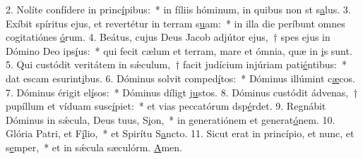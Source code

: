 2. Nolíte confídere in princ\uline{í}pibus:~* in fíliis hóminum, in quibus non st s\uline{a}lus.
3. Exíbit spíritus ejus, et revertétur in terram s\uline{u}am:~* in illa die períbunt omnes cogitatiónes \uline{ó}rum.
4. Beátus, cujus Deus Jacob adjútor ejus,~† spes ejus in Dómino Deo ips\uline{í}us:~* qui fecit cælum et terram, mare et ómnia, quæ in \uline{i}s sunt.
5. Qui custódit veritátem in sǽculum,~† facit judícium injúriam pati\uline{é}ntibus:~* dat escam esurint\uline{i}bus.
6. Dóminus solvit comped\uline{í}tos:~* Dóminus illúmint c\uline{æ}cos.
7. Dóminus érigit el\uline{í}sos:~* Dóminus díligt j\uline{u}stos.
8. Dóminus custódit ádvenas,~† pupíllum et víduam susc\uline{í}piet:~* et vias peccatórum dsp\uline{é}rdet.
9. Regnábit Dóminus in sǽcula, Deus tuus, S\uline{i}on,~* in generatiónem et generat\uline{ó}nem.
10. Glória Patri, et F\uline{í}lio,~* et Spirítu S\uline{a}ncto.
11. Sicut erat in princípio, et nunc, et s\uline{e}mper,~* et in sǽcula sæculórm. \uline{A}men.
